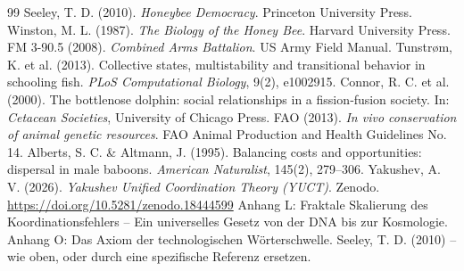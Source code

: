 \documentclass[12pt]{article}
\theoremstyle{remark}
\begin{document}
	\begin{thebibliography}{99}
		 Seeley, T. D. (2010). \emph{Honeybee Democracy}. Princeton University Press.
		 Winston, M. L. (1987). \emph{The Biology of the Honey Bee}. Harvard University Press.
		 FM 3-90.5 (2008). \emph{Combined Arms Battalion}. US Army Field Manual.
		 Tunstrøm, K. et al. (2013). Collective states, multistability and transitional behavior in schooling fish. \emph{PLoS Computational Biology}, 9(2), e1002915.
		 Connor, R. C. et al. (2000). The bottlenose dolphin: social relationships in a fission‑fusion society. In: \emph{Cetacean Societies}, University of Chicago Press.
		 FAO (2013). \emph{In vivo conservation of animal genetic resources}. FAO Animal Production and Health Guidelines No. 14.
		 Alberts, S. C. \& Altmann, J. (1995). Balancing costs and opportunities: dispersal in male baboons. \emph{American Naturalist}, 145(2), 279–306.
		 Yakushev, A. V. (2026). \emph{Yakushev Unified Coordination Theory (YUCT)}. Zenodo. \url{https://doi.org/10.5281/zenodo.18444599}
		 Anhang L: Fraktale Skalierung des Koordinationsfehlers – Ein universelles Gesetz von der DNA bis zur Kosmologie.
		 Anhang O: Das Axiom der technologischen Wörterschwelle.
		 Seeley, T. D. (2010) – wie oben, oder durch eine spezifische Referenz ersetzen.
	\end{thebibliography}
	
\end{document}
